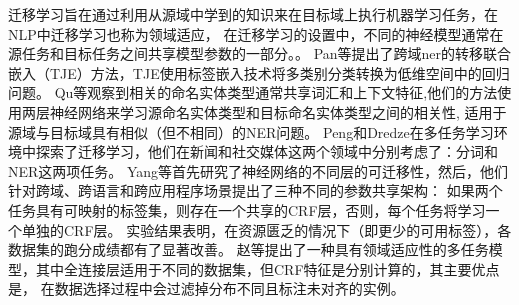 

迁移学习旨在通过利用从源域中学到的知识来在目标域上执行机器学习任务\cite{pan2009survey}，在NLP中迁移学习也称为领域适应，
在迁移学习的设置中，不同的神经模型通常在源任务和目标任务之间共享模型参数的一部分。。 
Pan等提出了跨域ner的转移联合嵌入（TJE）方法，TJE使用标签嵌入技术将多类别分类转换为低维空间中的回归问题\cite{pan2013transfer}。 
Qu等观察到相关的命名实体类型通常共享词汇和上下文特征\cite{qu2016named},他们的方法使用两层神经网络来学习源命名实体类型和目标命名实体类型之间的相关性,
适用于源域与目标域具有相似（但不相同）的NER问题。 
Peng和Dredze在多任务学习环境中探索了迁移学习\cite{peng2016multi}，他们在新闻和社交媒体这两个领域中分别考虑了：分词和NER这两项任务。
Yang等首先研究了神经网络的不同层的可迁移性\cite{yang2017transfer}，然后，他们针对跨域、跨语言和跨应用程序场景提出了三种不同的参数共享架构：
如果两个任务具有可映射的标签集，则存在一个共享的CRF层，否则，每个任务将学习一个单独的CRF层。
实验结果表明，在资源匮乏的情况下（即更少的可用标签），各数据集的跑分成绩都有了显著改善。 
赵等提出了一种具有领域适应性的多任务模型，其中全连接层适用于不同的数据集，但CRF特征是分别计算的，其主要优点是，
在数据选择过程中会过滤掉分布不同且标注未对齐的实例\cite{zhao2018improve}。



